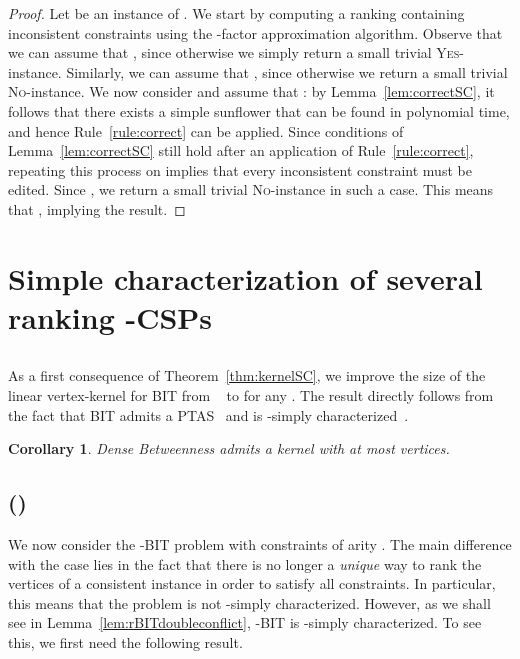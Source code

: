 \documentclass[11pt]{article}
\newtheorem{corollary}[theorem]{Corollary}
\newcommand{\BIT}{{\sc Dense Betweenness}}
\newcommand{\rBIT}{{\sc -Dense Betweenness}}
\begin{document}
\begin{proof}
	Let  be an instance of . We start by computing a ranking  containing  inconsistent constraints using the -factor approximation algorithm. Observe that we can assume that , since otherwise we simply return a small trivial \textsc{Yes}-instance. Similarly, we can assume that , since otherwise we return a small trivial \textsc{No}-instance. We now consider  and assume that : by Lemma~\ref{lem:correctSC}, it follows that there exists a simple sunflower that can be found in polynomial time, and hence Rule~\ref{rule:correct} can be applied. Since conditions of Lemma~\ref{lem:correctSC} still hold after an application of Rule~\ref{rule:correct}, repeating this process on  implies that every inconsistent constraint must be edited. Since , we return a small trivial \textsc{No}-instance in such a case. This means that , implying the result.
 \end{proof}

\section{Simple characterization of several ranking -CSPs}
\label{sec:ranking}

\subsection{{\sc \BIT{}}} 

As a first consequence of Theorem~\ref{thm:kernelSC}, we improve the size of the linear vertex-kernel for 
BIT from ~\cite{PPT11} to  for any . The result directly follows 
from the fact that BIT admits a PTAS~\cite{KS11} and is -simply characterized~\cite{PPT11}. 

\begin{corollary}
\label{thm:kernelbit}
	\BIT{} admits a kernel with at most  vertices.
\end{corollary}

\subsection{{\sc \rBIT{}} ()} 
\label{subsec:rbit}

We now consider the {\sc -BIT} problem with constraints of arity . The main difference with the case  lies in the fact that there is no longer a \emph{unique} way to rank the vertices of a consistent instance in order to satisfy all constraints. In particular, this means that the problem is not 
-simply characterized. 
However, as we shall see in Lemma~\ref{lem:rBITdoubleconflict}, {\sc -BIT} is -simply characterized. To see this, we first need the following result. 
\end{document}
